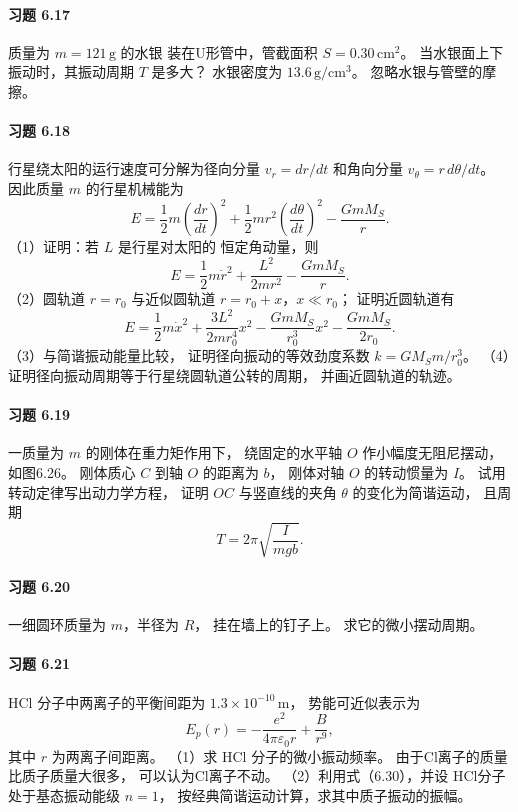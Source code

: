\paragraph{习题 6.17}
质量为 \(m=121\,\mathrm g\) 的水银
装在U形管中，管截面积
\(S=0.30\,\mathrm{cm^2}\)。
当水银面上下振动时，其振动周期
\(T\) 是多大？
水银密度为
\(13.6\,\mathrm{g/cm^3}\)。
忽略水银与管壁的摩擦。

\paragraph{习题 6.18}
行星绕太阳的运行速度可分解为径向分量
\(v_r=dr/dt\) 和角向分量
\(v_\theta=r\,d\theta/dt\)。
因此质量 \(m\) 的行星机械能为
\[
 E=\frac12m\left(\frac{dr}{dt}\right)^2
 +\frac12mr^2\left(\frac{d\theta}{dt}\right)^2
 -\frac{GmM_S}{r}.
\]
（1）证明：若 \(L\) 是行星对太阳的
恒定角动量，则
\[
 E=\frac12m\dot r^2+\frac{L^2}{2mr^2}
 -\frac{GmM_S}{r}.
\]
（2）圆轨道 \(r=r_0\) 与近似圆轨道
\(r=r_0+x\)，\(x\ll r_0\)；
证明近圆轨道有
\[
 E=\frac12m\dot x^2+
 \frac{3L^2}{2mr_0^4}x^2
 -\frac{GmM_S}{r_0^3}x^2
 -\frac{GmM_S}{2r_0}.
\]
（3）与简谐振动能量比较，
证明径向振动的等效劲度系数
\(k=GM_Sm/r_0^3\)。
（4）证明径向振动周期等于行星绕圆轨道公转的周期，
并画近圆轨道的轨迹。

\paragraph{习题 6.19}
一质量为 \(m\) 的刚体在重力矩作用下，
绕固定的水平轴 \(O\) 作小幅度无阻尼摆动，
如图6.26。
刚体质心 \(C\) 到轴 \(O\) 的距离为 \(b\)，
刚体对轴 \(O\) 的转动惯量为 \(I\)。
试用转动定律写出动力学方程，
证明 \(OC\) 与竖直线的夹角
\(\theta\) 的变化为简谐运动，
且周期
\[
 T=2\pi\sqrt{\frac I{mgb}}.
\]

\paragraph{习题 6.20}
一细圆环质量为 \(m\)，半径为 \(R\)，
挂在墙上的钉子上。
求它的微小摆动周期。

\paragraph{习题 6.21}
HCl 分子中两离子的平衡间距为
\(1.3\times10^{-10}\,\mathrm m\)，
势能可近似表示为
\[
 E_p(r)=-\frac{e^2}{4\pi\varepsilon_0r}+\frac{B}{r^9},
\]
其中 \(r\) 为两离子间距离。
（1）求 HCl 分子的微小振动频率。
由于Cl离子的质量比质子质量大很多，
可以认为Cl离子不动。
（2）利用式（6.30），并设
HCl分子处于基态振动能级 \(n=1\)，
按经典简谐运动计算，求其中质子振动的振幅。

